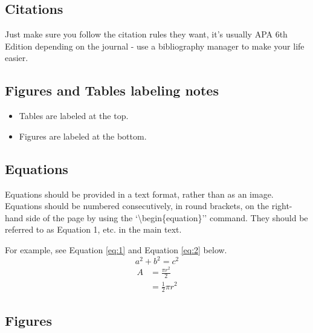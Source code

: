 \documentclass{article}
\begin{document}
	
	\subsection*{Citations}
	Just make sure you follow the citation rules they want, it's usually APA 6th Edition depending on the journal - use a bibliography manager to make your life easier. 
	
	
	\subsection*{Figures and Tables labeling notes}
	\begin{itemize}
		\item Tables are labeled at the top.
		\item Figures are labeled at the bottom.
	\end{itemize}
	
	
	
	\subsection*{Equations}
	Equations should be provided in a text format, rather than as an image. Equations should be numbered consecutively, in round brackets, on the right-hand side of the page by using the `\textbackslash begin\{equation\}'' command. They should be referred to as Equation 1, etc. in the main text.
	
	\medskip For example, see Equation \ref{eq:1} and Equation \ref{eq:2} below.
	\begin{equation} \label{eq:1}
		a^2 + b^2 = c^2 
	\end{equation}
	\begin{equation} \label{eq:2}
		\begin{split}
			A & = \frac{\pi r^2}{2} \\
			& = \frac{1}{2} \pi r^2
		\end{split}
	\end{equation}
	
	
	
	
	\subsection*{Figures}
	
\end{document}
